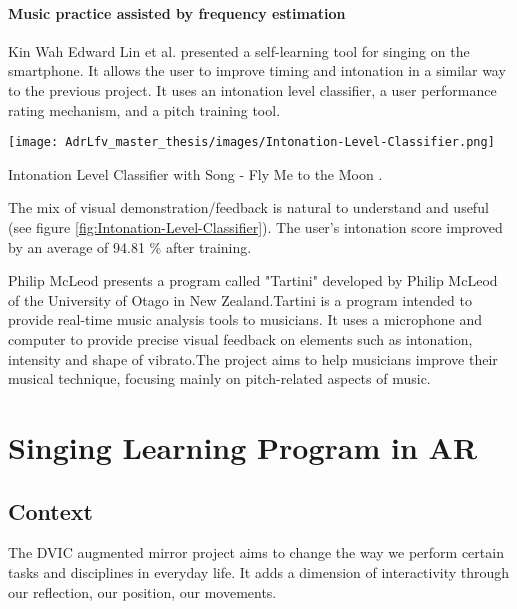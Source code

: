 \paragraph{Music practice assisted by frequency estimation}


Kin Wah Edward Lin et al. presented a self-learning tool for singing on the smartphone. It allows the user to improve timing and intonation in a similar way to the previous project. It uses an intonation level classifier, a user performance rating mechanism, and a pitch training tool. 

\begin{marginfigure}
    \centering
    \texttt{[image: AdrLfv\_master\_thesis/images/Intonation-Level-Classifier.png]}
    \caption{Intonation Level Classifier with Song - Fly Me to the Moon \cite{lin2014implementation}.}
    \label{fig:Intonation-Level-Classifier}
\end{marginfigure}

The mix of visual demonstration/feedback is natural to understand and useful (see figure \ref{fig:Intonation-Level-Classifier}). The user’s intonation score improved by an average of 94.81 \% after training.

Philip McLeod \cite{mcleodtartini} presents a program called "Tartini" developed by Philip McLeod of the University of Otago in New Zealand.Tartini is a program intended to provide real-time music analysis tools to musicians. It uses a microphone and computer to provide precise visual feedback on elements such as intonation, intensity and shape of vibrato.The project aims to help musicians improve their musical technique, focusing mainly on pitch-related aspects of music.

\section{Singing Learning Program in AR}

\subsection{Context}

The DVIC augmented mirror project aims to change the way we perform certain tasks and disciplines in everyday life.
It adds a dimension of interactivity through our reflection, our position, our movements.

